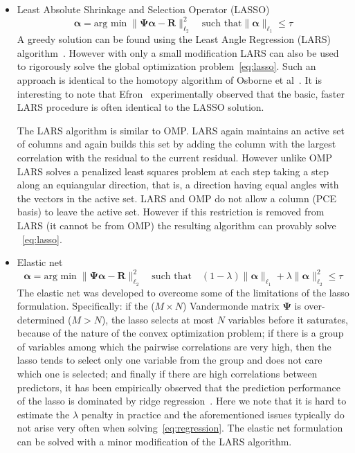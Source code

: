 \begin{itemize}
\item Least Absolute Shrinkage and Selection Operator (LASSO)~\cite{Tibshirani1996}
\begin{equation}
\label{eq:lasso}
 \boldsymbol{\alpha} = \text{arg min}\; \|\boldsymbol{\Psi}\boldsymbol{\alpha} - \boldsymbol{R}\|_{\ell_2}^2 \quad \text{such that}\|\boldsymbol{\alpha}\|_{\ell_1} \le \tau
\end{equation}
A greedy solution can be found using the Least Angle Regression (LARS) algorithm~\cite{Efron2004}.
However with only a small modification LARS can also be used to rigorously solve the 
global optimization problem~\eqref{eq:lasso}. Such an approach is identical to the homotopy algorithm of
Osborne et al~\cite{Osborne2000}. It is interesting to note that 
Efron~\cite{Efron2004} experimentally observed that the basic, faster LARS 
procedure is often identical to the LASSO solution.

The LARS algorithm is similar to OMP. LARS again maintains an active set of columns and again builds
this set by adding the column with the largest correlation with the residual to the current residual.
However unlike OMP LARS solves a penalized least squares problem at each step taking a step along an equiangular direction, that is, a direction
having equal angles with the vectors in the active set. LARS and OMP do not allow a column (PCE basis)
to leave the active set. However if this restriction is removed from LARS (it cannot be from OMP)
the resulting algorithm can provably solve ~\eqref{eq:lasso}.

\item Elastic net~\cite{Zou2005}
\begin{equation}
\label{eq:elastic-net}
 \boldsymbol{\alpha} = \text{arg min}\; \|\boldsymbol{\Psi}\boldsymbol{\alpha} - \boldsymbol{R}\|_{\ell_2}^2 \quad \text{such that}\quad (1-\lambda)\|\boldsymbol{\alpha}\|_{\ell_1} + 
\lambda\|\boldsymbol{\alpha}\|_{\ell_2}^2 \le \tau
\end{equation}
The elastic net was developed to overcome some of the limitations of the lasso formulation. 
Specifically: if the ($M\times N$) Vandermonde matrix $\boldsymbol{\Psi}$ is over-determined ($M>N$), 
the lasso selects at most $N$ variables before it saturates, because of the
nature of the convex optimization problem; if there is a group of variables among which the pairwise correlations are very high, then
the lasso tends to select only one variable from the group and does not care which one is
selected; and finally if there are high correlations between predictors, it has been
empirically observed that the prediction performance of the lasso is dominated by ridge
regression~\cite{Tibshirani1996}. Here we note that it is hard to estimate the $\lambda$ 
penalty in practice and the aforementioned issues typically do not arise very often when 
solving~\eqref{eq:regression}. The elastic net formulation can be solved with a minor modification of
the LARS algorithm.
\end{itemize}

